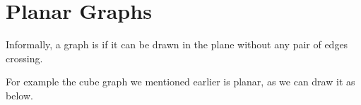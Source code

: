 \documentclass[a4paper]{scrartcl}
\begin{document}
\section{Planar Graphs}

Informally, a graph is  if
it can be drawn in the plane without any pair of edges crossing.

For example the cube graph we mentioned earlier is planar, as we can draw it as below.

\begin{center}
	


\begin{tikzpicture}[x=0.75pt,y=0.75pt,yscale=-1,xscale=1]


\end{tikzpicture}
\end{center}
\end{document}
